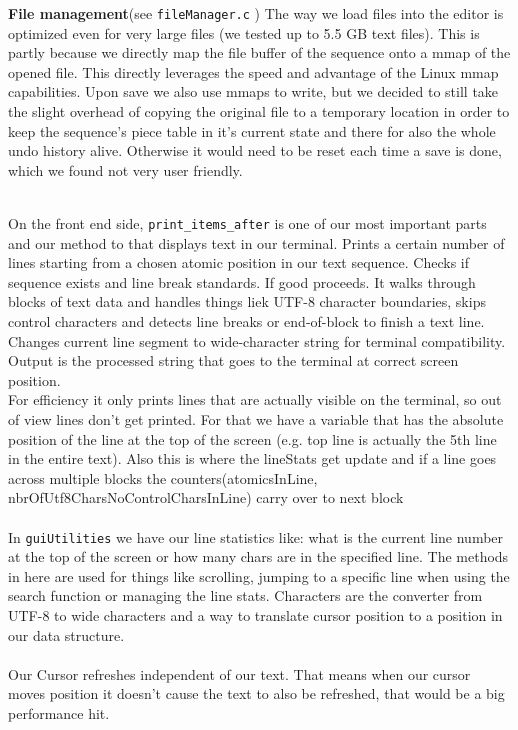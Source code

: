 \textbf{File management}(see \verb|fileManager.c| \cite{GithubRepo}) The way we load files into the editor is optimized even for very large files (we tested up to 5.5 GB text files). This is partly because we directly map the file buffer of the sequence onto a mmap of the opened file. This directly leverages the speed and advantage of the Linux mmap capabilities. Upon save we also use mmaps to write, but we decided to still take the slight overhead of copying the original file to a temporary location in order to keep the sequence's piece table in it's current state and there for also the whole undo history alive. Otherwise it would need to be reset each time a save is done, which we found not very user friendly. 

\noindent
\\On the front end side, \verb|print_items_after| is one of our most important parts and our method to that displays text in our terminal. Prints a certain number of lines starting from a chosen atomic position in our text sequence.
Checks if sequence exists and line break standards. If good proceeds. It walks through blocks of text data and handles things liek UTF-8 character boundaries, skips control characters and detects line breaks or end-of-block to finish a text line.
\\Changes current line segment to wide-character string for terminal compatibility.
Output is the processed string that goes to the terminal at correct screen position.
\\For efficiency it only prints lines that are actually visible on the terminal, so out of view lines don't get printed. For that we have a variable that has the absolute position of the line at the top of the screen (e.g. top line is actually the 5th line in the entire text).
Also this is where the lineStats get update and if a line goes across multiple blocks the counters(atomicsInLine, nbrOfUtf8CharsNoControlCharsInLine) carry over to next block
\\
\\In \verb|guiUtilities| we have our line statistics like: what is the current line number at the top of the screen or how many chars are in the specified line. The methods in here are used for things like scrolling, jumping to a specific line when using the search function or managing the line stats.
Characters are the converter from UTF-8 to wide characters and a way to translate cursor position to a position in our data structure.
\\
\\Our Cursor refreshes independent of our text. That means when our cursor moves position it doesn't cause the text to also be refreshed, that would be a big performance hit.